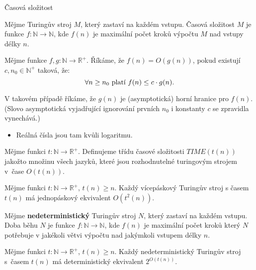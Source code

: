 \begin{frame}{Časová složitost}
    \begin{definition}
    Mějme Turingův stroj $M$, který zastaví na každém vstupu.
    \alert{Časová složitost} $M$ je funkce $f:\mathbb{N}\to \mathbb{N}$, kde $f(n)$ je maximální počet kroků výpočtu $M$ nad vstupy délky $n$.
    \end{definition}
    \begin{definition}
    Mějme funkce $f,g: \mathbb{N}\to \mathbb{R}^+$. Říkáme, že \alert{$f(n)=O(g(n))$}, pokud existují $c,n_0\in \mathbb{N}^+$ taková, že:
    $$\forall n\geq n_0 \hbox{ platí  } f(n)\leq c\cdot g(n)\hbox{.}
    $$
    
    V takovém případě říkáme, že $g(n)$ je (asymptotická) \alert{horní hranice} pro $f(n)$. (Slovo asymptotická vyjadřující ignorování prvních $n_0$ i konstanty $c$ se zpravidla vynechává.)
    \end{definition}
    \begin{itemize}
        \item[] Reálná čísla jsou tam kvůli logaritmu.
    \end{itemize}
    \end{frame}
    
    
    
    \newcommand{\T}{TIME}
    \begin{frame}%
    \begin{definition}
    Mějme funkci $t: \mathbb{N}\to \mathbb{R}^+$. Definujeme \alert{třídu časové složitosti $\T(t(n))$} jakožto množinu všech jazyků, které jsou rozhodnutelné turingovým strojem v~čase $O(t(n))$.
    
    \end{definition}
    
    \begin{lemma}
    Mějme funkci $t: \mathbb{N}\to \mathbb{R}^+$, $t(n)\geq n$. Každý vícepáskový Turingův stroj s časem $t(n)$ má jednopáskový ekvivalent $O(t^2(n))$.
    \end{lemma}
    \begin{definition}
    Mějme {\bf nedeterministický} Turingův stroj $N$, který zastaví na každém vstupu.
     \alert{Doba běhu $N$} je funkce $f: \mathbb{N}\to \mathbb{N}$, kde $f(n)$ je maximální počet kroků který $N$ potřebuje v jakékoli větvi výpočtu nad jakýmkoli vstupem délky $n$.
    
    \end{definition}
    
    \begin{lemma}
    Mějme funkci $t: \mathbb{N}\to \mathbb{R}^+$, $t(n)\geq n$. Každý nedeterministický Turingův stroj s~časem $t(n)$ má deterministický ekvivalent $2^{O(t(n))}$.
    \end{lemma}
    
    \end{frame}
    
